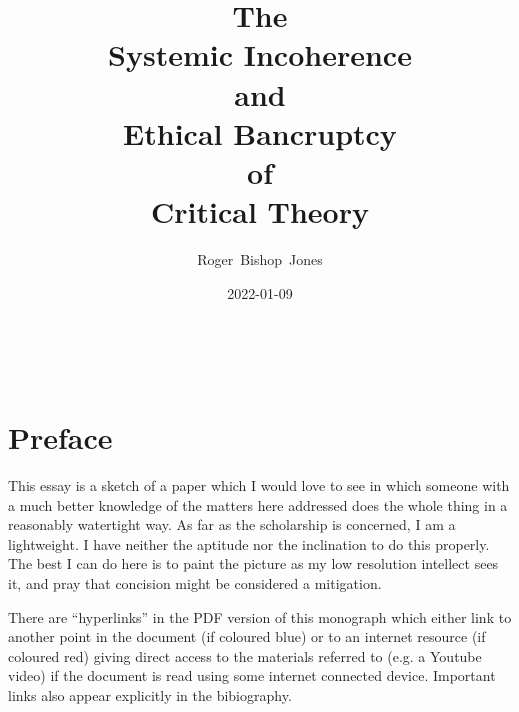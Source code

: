 \documentclass[10pt,titlepage]{article}
\title{\bf{\LARGE The\\Systemic Incoherence\\and\\Ethical Bancruptcy\\of\\Critical Theory}}
\author{Roger~Bishop~Jones}
\date{\small 2022-01-09}
\newcommand{\ignore}[1]{}
\begin{document}
% 
                               
\begin{titlepage}
\maketitle





\end{titlepage}

\ \

\ignore{
\begin{centering}
{}
\end{centering}
}%

\setcounter{tocdepth}{2}
{\parskip-0pt\tableofcontents}


\pagebreak

\section*{Preface}


This essay is a sketch of a paper which I would love to see in which someone with a much better knowledge of the matters here addressed does the whole thing in a reasonably watertight way.
As far as the scholarship is concerned, I am a lightweight.
I have neither the aptitude nor the inclination to do this properly.
The best I can do here is to paint the picture as my low resolution intellect sees it, and pray that concision might be considered a mitigation.

There are ``hyperlinks'' in the PDF version of this monograph which either link to another point in the document  (if coloured blue) or to an internet resource  (if coloured red) giving direct access to the materials referred to (e.g. a Youtube video) if the document is read using some internet connected device.
Important links also appear explicitly in the bibiography.
\end{document}
